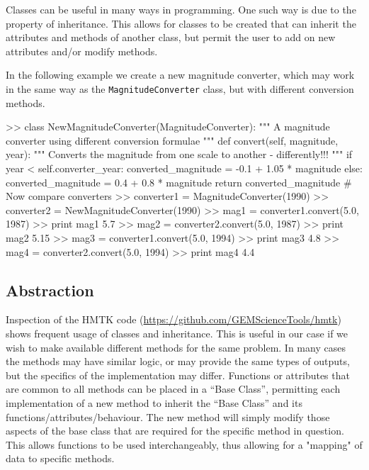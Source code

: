 Classes can be useful in many ways in programming. One such way is due to the property of inheritance. This allows for classes to be created that can inherit the attributes and methods of another class, but permit the user to add on new attributes and/or modify methods. 

In the following example we create a new magnitude converter, which may work in the same way as the \verb=MagnitudeConverter= class, but with different conversion methods.

\begin{python}[frame=single]
>> class NewMagnitudeConverter(MagnitudeConverter):
       """
       A magnitude converter using different conversion
       formulae
       """
       def convert(self, magnitude, year):
           """
           Converts the magnitude from one scale to another
           - differently!!!
           """
           if year < self.converter_year:
               converted_magnitude = -0.1 + 1.05 * magnitude
           else:
               converted_magnitude = 0.4 + 0.8 * magnitude
           return converted_magnitude
# Now compare converters
>> converter1 = MagnitudeConverter(1990)
>> converter2 = NewMagnitudeConverter(1990)
>> mag1 = converter1.convert(5.0, 1987)
>> print mag1
5.7
>> mag2 = converter2.convert(5.0, 1987)
>> print mag2
5.15
>> mag3 = converter1.convert(5.0, 1994)
>> print mag3
4.8
>> mag4 = converter2.convert(5.0, 1994)
>> print mag4
4.4    
\end{python}

\subsection{Abstraction}

Inspection of the HMTK code (\href{https://github.com/GEMScienceTools/hmtk}{https://github.com/GEMScienceTools/hmtk}) shows frequent usage of classes and inheritance. This is useful in our case if we wish to make available different methods for the same problem. In many cases the methods may have similar logic, or may provide the same types of outputs, but the specifics of the implementation may differ. Functions or attributes that are common to all methods can be placed in a ``Base Class'', permitting each implementation of a new method to inherit the ``Base Class'' and its functions/attributes/behaviour. The new method will simply modify those aspects of the base class that are required for the specific method in question. This allows functions to be used interchangeably, thus allowing for a "mapping" of data to specific methods. 

